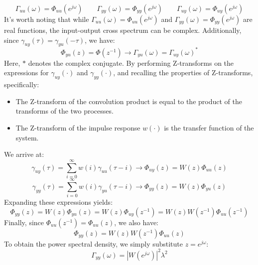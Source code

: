 \[\Gamma_{uu}(\omega)=\Phi_{uu}(e^{j\omega}) \qquad \Gamma_{yy}(\omega)=\Phi_{yy}(e^{j\omega}) \qquad \Gamma_{uy}(\omega)=\Phi_{uy}(e^{j\omega})\]
It's worth noting that while $\Gamma_{uu}(\omega)=\Phi_{uu}(e^{j\omega})$ and $\Gamma_{yy}(\omega)=\Phi_{yy}(e^{j\omega})$ are real functions, the input-output cross spectrum can be complex. 
Additionally, since $\gamma_{uy}(\tau)=\gamma_{yu}(-\tau)$, we have:
\[\Phi_{yu}(z)=\Phi(z^{-1})\rightarrow\Gamma_{yu}(\omega)=\Gamma_{uy}(\omega)^\ast\]
Here, $\ast$ denotes the complex conjugate.
By performing Z-transforms on the expressions for $\gamma_{uy}(\cdot)$ and $\gamma_{yy}(\cdot)$, and recalling the properties of Z-transforms, specifically:
\begin{itemize}
    \item The Z-transform of the convolution product is equal to the product of the transforms of the two processes.
    \item The Z-transform of the impulse response $w(\cdot)$ is the transfer function of the system.
\end{itemize}
We arrive at:
\[\gamma_{uy}(\tau)=\sum_{i=0}^{\infty}w(i)\gamma_{uu}(\tau-i)\rightarrow\Phi_{uy}(z)=W(z)\Phi_{uu}(z)\]
\[\gamma_{yy}(\tau)=\sum_{i=0}^{\infty}w(i)\gamma_{yu}(\tau-i)\rightarrow\Phi_{yy}(z)=W(z)\Phi_{yu}(z)\]
Expanding these expressions yields:
\[\Phi_{yy}(z)=W(z)\Phi_{yu}(z)=W(z)\Phi_{uy}(z^{-1})=W(z)W(z^{-1})\Phi_{uu}(z^{-1})\]
Finally, since $\Phi_{uu}(z^{-1})=\Phi_{uu}(z)$, we also have:
\[\Phi_{yy}(z)=W(z)W(z^{-1})\Phi_{uu}(z)\]
To obtain the power spectral density, we simply substitute $z = e^{j\omega}$:
\[\Gamma_{yy}(\omega)=\left\lvert W(e^{j\omega})\right\rvert^2\lambda^2 \]

